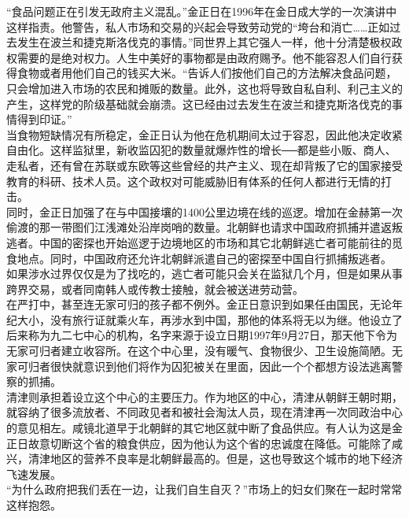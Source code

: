 “食品问题正在引发无政府主义混乱。”金正日在1996年在金日成大学的一次演讲中这样指责。他警告，私人市场和交易的兴起会导致劳动党的“垮台和消亡……正如过去发生在波兰和捷克斯洛伐克的事情。”同世界上其它强人一样，他十分清楚极权政权需要的是绝对权力。人生中美好的事物都是由政府赐予。他不能容忍人们自行获得食物或者用他们自己的钱买大米。“告诉人们按他们自己的方法解决食品问题，只会增加进入市场的农民和摊贩的数量。此外，这也将导致自私自利、利己主义的产生，这样党的阶级基础就会崩溃。这已经由过去发生在波兰和捷克斯洛伐克的事情得到印证。”\\

当食物短缺情况有所稳定，金正日认为他在危机期间太过于容忍，因此他决定收紧自由化。这样监狱里，新收监囚犯的数量就爆炸性的增长──都是些小贩、商人、走私者，还有曾在苏联或东欧等这些曾经的共产主义、现在却背叛了它的国家接受教育的科研、技术人员。这个政权对可能威胁旧有体系的任何人都进行无情的打击。\\

同时，金正日加强了在与中国接壤的1400公里边境在线的巡逻。增加在金赫第一次偷渡的那一带图们江浅滩处沿岸岗哨的数量。北朝鲜也请求中国政府抓捕并遣返叛逃者。中国的密探也开始巡逻于边境地区的市场和其它北朝鲜逃亡者可能前往的觅食地点。同时，中国政府还允许北朝鲜派遣自己的密探至中国自行抓捕叛逃者。\\

如果涉水过界仅仅是为了找吃的，逃亡者可能只会关在监狱几个月，但是如果从事跨界交易，或者同南韩人或传教士接触，就会被送进劳动营。\\

在严打中，甚至连无家可归的孩子都不例外。金正日意识到如果任由国民，无论年纪大小，没有旅行证就乘火车，再涉水到中国，那他的体系将无以为继。他设立了后来称为九二七中心的机构，名字来源于设立日期1997年9月27日，那天他下令为无家可归者建立收容所。在这个中心里，没有暖气、食物很少、卫生设施简陋。无家可归者很快就意识到他们将作为囚犯被关在里面，因此一个个都想方设法逃离警察的抓捕。\\

清津则承担着设立这个中心的主要压力。作为地区的中心，清津从朝鲜王朝时期，就容纳了很多流放者、不同政见者和被社会淘汰人员，现在清津再一次同政治中心的意见相左。咸镜北道早于北朝鲜的其它地区就中断了食品供应。有人认为这是金正日故意切断这个省的粮食供应，因为他认为这个省的忠诚度在降低。可能除了咸兴，清津地区的营养不良率是北朝鲜最高的。但是，这也导致这个城市的地下经济飞速发展。\\

“为什么政府把我们丢在一边，让我们自生自灭？”市场上的妇女们聚在一起时常常这样抱怨。\\

